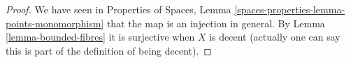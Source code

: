 \documentclass{stacks-project}
\theoremstyle{plain}
\theoremstyle{definition}
\theoremstyle{remark}
\numberwithin{equation}{subsection}
\begin{document}
\begin{proof}
We have seen in
Properties of Spaces,
Lemma \ref{spaces-properties-lemma-points-monomorphism}
that the map is an injection in general.
By Lemma \ref{lemma-bounded-fibres} it is surjective when $X$ is
decent (actually one can say this is part of the definition
of being decent).
\end{proof}
\end{document}

